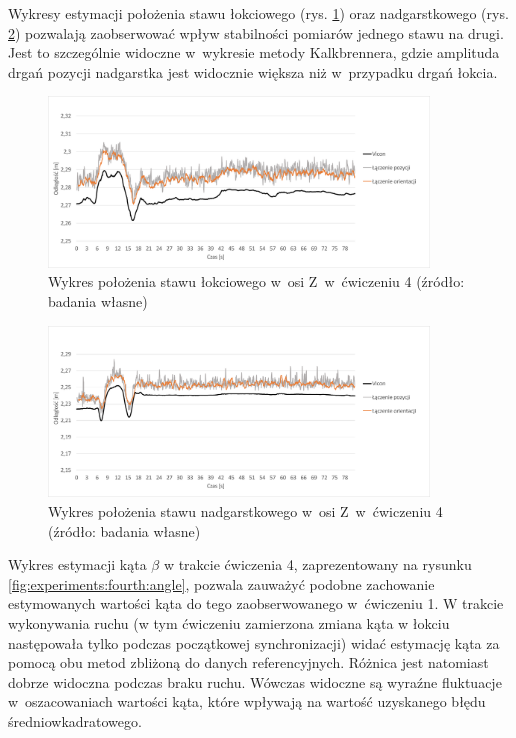 Wykresy estymacji położenia stawu łokciowego (rys. \ref{fig:experiments:four:elbowZ}) oraz nadgarstkowego (rys. \ref{fig:experiments:four:wristZ}) pozwalają zaobserwować wpływ stabilności pomiarów jednego stawu na drugi. Jest to szczególnie widoczne w~wykresie metody Kalkbrennera, gdzie amplituda drgań pozycji nadgarstka jest widocznie większa niż w~przypadku drgań łokcia. 
					
\begin{figure}[!htb]
	\centering	
		\includegraphics[width=0.9\textwidth]{images/400/3.png}		
		\caption[Wykres położenia stawu łokciowego w~osi Z~w~ćwiczeniu 4]{Wykres położenia stawu łokciowego w~osi Z~w~ćwiczeniu 4 (źródło: badania własne)}
		\label{fig:experiments:four:elbowZ}
\end{figure}
\begin{figure}[!htb]
	\centering
		\includegraphics[width=0.9\textwidth]{images/400/6.png}		
		\caption[Wykres położenia stawu nadgarstkowego w~osi Z~w~ćwiczeniu 4]{Wykres położenia stawu nadgarstkowego w~osi Z~w~ćwiczeniu 4 (źródło: badania własne)}	
		\label{fig:experiments:four:wristZ}
\end{figure}
		
Wykres estymacji kąta $\beta$ w trakcie ćwiczenia 4, zaprezentowany na rysunku \ref{fig:experiments:fourth:angle}, pozwala zauważyć podobne zachowanie estymowanych wartości kąta do tego zaobserwowanego w~ćwiczeniu 1. W trakcie wykonywania ruchu (w tym ćwiczeniu zamierzona zmiana kąta w łokciu następowała tylko podczas początkowej synchronizacji) widać estymację kąta za pomocą obu metod zbliżoną do danych referencyjnych. Różnica jest natomiast dobrze widoczna podczas braku ruchu. Wówczas widoczne są wyraźne fluktuacje w~oszacowaniach wartości kąta, które wpływają na wartość uzyskanego błędu średniowkadratowego.
			
